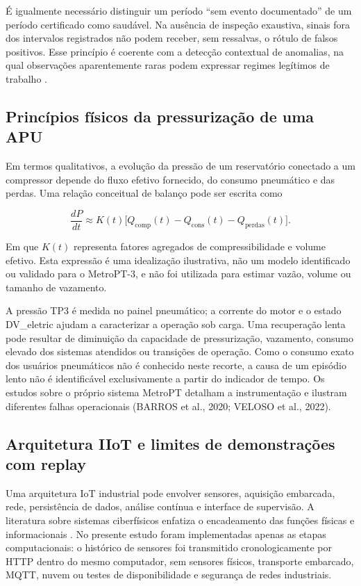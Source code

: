 \documentclass[conference]{IEEEtran}
\begin{document}
É igualmente necessário distinguir um período ``sem evento documentado'' de um período certificado como saudável. Na ausência de inspeção exaustiva, sinais fora dos intervalos registrados não podem receber, sem ressalvas, o rótulo de falsos positivos. Esse princípio é coerente com a detecção contextual de anomalias, na qual observações aparentemente raras podem expressar regimes legítimos de trabalho \cite{chandola2009anomaly}.

\subsection{Princípios físicos da pressurização de uma APU}

Em termos qualitativos, a evolução da pressão de um reservatório conectado a um compressor depende do fluxo efetivo fornecido, do consumo pneumático e das perdas. Uma relação conceitual de balanço pode ser escrita como

\begin{equation}\label{eq:balanco}\frac{dP}{dt}\approx K(t)\bigl[Q_{\mathrm{comp}}(t)-Q_{\mathrm{cons}}(t)-Q_{\mathrm{perdas}}(t)\bigr].\end{equation}

Em que $K(t)$ representa fatores agregados de compressibilidade e volume efetivo. Esta expressão é uma idealização ilustrativa, não um modelo identificado ou validado para o MetroPT-3, e não foi utilizada para estimar vazão, volume ou tamanho de vazamento.

A pressão TP3 é medida no painel pneumático; a corrente do motor e o estado DV\_eletric ajudam a caracterizar a operação sob carga. Uma recuperação lenta pode resultar de diminuição da capacidade de pressurização, vazamento, consumo elevado dos sistemas atendidos ou transições de operação. Como o consumo exato dos usuários pneumáticos não é conhecido neste recorte, a causa de um episódio lento não é identificável exclusivamente a partir do indicador de tempo. Os estudos sobre o próprio sistema MetroPT detalham a instrumentação e ilustram diferentes falhas operacionais (BARROS et al., 2020; VELOSO et al., 2022).

\subsection{Arquitetura IIoT e limites de demonstrações com replay}

Uma arquitetura IoT industrial pode envolver sensores, aquisição embarcada, rede, persistência de dados, análise contínua e interface de supervisão. A literatura sobre sistemas ciberfísicos enfatiza o encadeamento das funções físicas e informacionais \cite{lee2015cps}. No presente estudo foram implementadas apenas as etapas computacionais: o histórico de sensores foi transmitido cronologicamente por HTTP dentro do mesmo computador, sem sensores físicos, transporte embarcado, MQTT, nuvem ou testes de disponibilidade e segurança de redes industriais.
\end{document}
